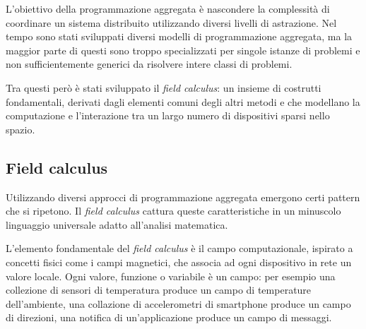 L'obiettivo della programmazione aggregata è nascondere la complessità di
coordinare un sistema distribuito utilizzando diversi livelli di astrazione.
Nel tempo sono stati sviluppati diversi modelli di programmazione aggregata, ma
la maggior parte di questi sono troppo specializzati per singole istanze di
problemi e non sufficientemente generici da risolvere intere classi di
problemi\cite{beal2012}.

Tra questi però è stati sviluppato il \textit{field calculus}: un insieme di
costrutti fondamentali, derivati dagli elementi comuni degli altri metodi e che
modellano la computazione e l'interazione tra un largo numero di dispositivi
sparsi nello spazio.

\subsection{Field calculus}
Utilizzando diversi approcci di programmazione aggregata emergono certi pattern
che si ripetono. Il \textit{field calculus} \cite{Viroli2013} cattura queste
caratteristiche in un minuscolo linguaggio universale adatto all'analisi
matematica.

L'elemento fondamentale del \textit{field calculus} è il campo computazionale,
ispirato a concetti fisici come i campi magnetici, che associa ad ogni
dispositivo in rete un valore locale. Ogni valore, funzione o variabile è un
campo: per esempio una collezione di sensori di temperatura produce un campo di
temperature dell'ambiente, una collazione di accelerometri di smartphone produce
un campo di direzioni, una notifica di un'applicazione produce un campo di
messaggi.

